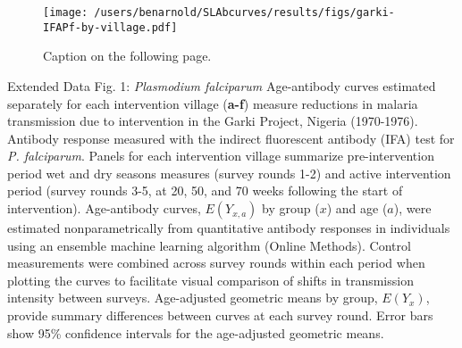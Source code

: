 \documentclass[11pt]{article}
\begin{document}
\clearpage
\begin{figure}[htbp]
\begin{center}
\texttt{[image: /users/benarnold/SLAbcurves/results/figs/garki-IFAPf-by-village.pdf]}
\begin{minipage}{\textwidth}
\caption{Caption on the following page.}
\label{fig:garkiVillageEy}
\end{minipage}
\end{center}
\end{figure}
\clearpage
Extended Data Fig. 1: \textit{Plasmodium falciparum} Age-antibody curves estimated separately for each intervention village (\textbf{a-f}) measure reductions in malaria transmission due to intervention in the Garki Project, Nigeria (1970-1976).  Antibody response measured with the indirect fluorescent antibody (IFA) test for \textit{P. falciparum}. Panels for each intervention village summarize pre-intervention period wet and dry seasons measures (survey rounds 1-2) and active intervention period (survey rounds 3-5, at 20, 50, and 70 weeks following the start of intervention).  Age-antibody curves, $E(Y_{x,a})$ by group ($x$) and age ($a$), were estimated nonparametrically from quantitative antibody responses in individuals using an ensemble machine learning algorithm (Online Methods). Control measurements were combined across survey rounds within each period when plotting the curves to facilitate visual comparison of shifts in transmission intensity between surveys. Age-adjusted geometric means by group, $E(Y_x)$, provide summary differences between curves at each survey round. Error bars show 95\% confidence intervals for the age-adjusted geometric means.
\end{document}
